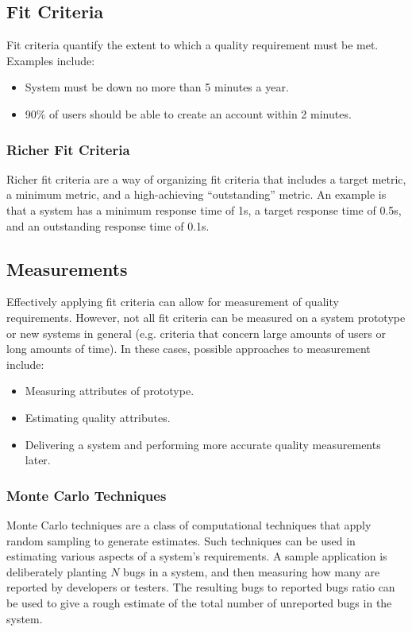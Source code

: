 \documentclass[12pt,titlepage]{article}
\begin{document}
    \subsection{Fit Criteria}
      Fit criteria quantify the extent to which a quality requirement must be met. Examples include:
      \begin{itemize}
        \item System must be down no more than 5 minutes a year.
        \item 90\% of users should be able to create an account within 2 minutes.
      \end{itemize}

      \subsubsection{Richer Fit Criteria}
        Richer fit criteria are a way of organizing fit criteria that includes a target metric, a minimum metric, and a high-achieving ``outstanding''
        metric. An example is that a system has a minimum response time of 1s, a target response time of 0.5s, and an outstanding response time
        of 0.1s.

    \subsection{Measurements}
      Effectively applying fit criteria can allow for measurement of quality requirements. However, not all fit criteria can be measured on a system
      prototype or new systems in general (e.g. criteria that concern large amounts of users or long amounts of time). In these cases, possible approaches
      to measurement include:
      \begin{itemize}
        \item Measuring attributes of prototype.
        \item Estimating quality attributes.
        \item Delivering a system and performing more accurate quality measurements later.
      \end{itemize}

      \subsubsection{Monte Carlo Techniques}
        Monte Carlo techniques are a class of computational techniques that apply random sampling to generate estimates. Such techniques can be used in
        estimating various aspects of a system's requirements. A sample application is deliberately planting $N$ bugs in a system, and then measuring how
        many are reported by developers or testers. The resulting bugs to reported bugs ratio can be used to give a rough estimate of the total number of
        unreported bugs in the system.
\end{document}
